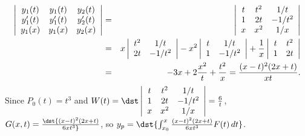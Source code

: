\documentclass[dvips]{book}
\renewcommand{\exer}[1]{\par\medskip\;\noindent{\color{red}\bf #1.}}
\numberwithin{example}{section}
\numberwithin{equation}{section}
\numberwithin{theorem}{section}
\numberwithin{table}{section}
\numberwithin{figure}{section}
\begin{document}
\exer{9.4.36}
\begin{eqnarray*}
\left|\begin{array}{ccc}
y_1(t)&y_1(t)&y_2(t)\\
y_1'(t)&y_1'(t)&y_2'(t)\\
y_1(x)&y_1(x)&y_2(x)\\
\end{array}\right| &=&
\left|\begin{array}{cccc}
t&t^2&1/t\\
1&2t&-1/t^2\\
x&x^2&1/x
\end{array}\right|\\
&=&
x\left|\begin{array}{cccc}t^2&1/t\\2t&-1/t^2\end{array}\right|
-x^2\left|\begin{array}{cccc}t&1/t\\1&-1/t^2\end{array}\right|
+{1\over x}\left|\begin{array}{cccc}t&t^2\\1&2t\end{array}\right|\\
&=&-3x+2{x^2\over t}+{t^2\over x}={(x-t)^2(2x+t)\over xt}.
\end{eqnarray*}
Since $P_0(t)=t^3$ and
$W(t)=\dst\left|\begin{array}{ccc}
t&t^2&1/t\\
1&2t&-1/t^2\\
x&x^2&1/x
\end{array}\right|={6\over t}$,
$G(x,t)=\dst {(x-t)^2(2x+t)\over6xt^3}$,
so
$y_p=\dst{\int_{x_0}^x {(x-t)^2(2x+t)\over6xt^3}
F(t)\,dt}$.
\end{document}
